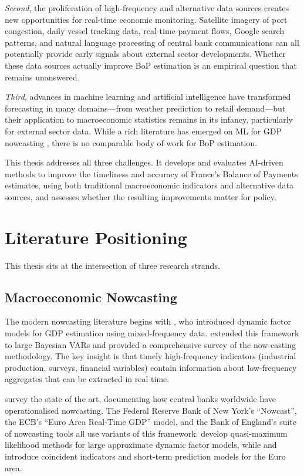 \emph{Second}, the proliferation of high-frequency and alternative data sources creates new opportunities for real-time economic monitoring.  Satellite imagery of port congestion, daily vessel tracking data, real-time payment flows, Google search patterns, and natural language processing of central bank communications can all potentially provide early signals about external sector developments.  Whether these data sources actually improve BoP estimation is an empirical question that remains unanswered.

\emph{Third}, advances in machine learning and artificial intelligence have transformed forecasting in many domains---from weather prediction to retail demand---but their application to macroeconomic statistics remains in its infancy, particularly for external sector data.  While a rich literature has emerged on ML for GDP nowcasting \citep{giannone2008nowcasting, banbura2013nowcasting, gouletcoulombe2022how}, there is no comparable body of work for BoP estimation.

This thesis addresses all three challenges.  It develops and evaluates AI-driven methods to improve the timeliness and accuracy of France's Balance of Payments estimates, using both traditional macroeconomic indicators and alternative data sources, and assesses whether the resulting improvements matter for policy.


\section*{Literature Positioning}

This thesis sits at the intersection of three research strands.

\subsection*{Macroeconomic Nowcasting}

The modern nowcasting literature begins with \citet{giannone2008nowcasting}, who introduced dynamic factor models for GDP estimation using mixed-frequency data.  \citet{banbura2010large, banbura2013nowcasting} extended this framework to large Bayesian VARs and provided a comprehensive survey of the now-casting methodology.  The key insight is that timely high-frequency indicators (industrial production, surveys, financial variables) contain information about low-frequency aggregates that can be extracted in real time.

\citet{bok2018macroeconomic} survey the state of the art, documenting how central banks worldwide have operationalised nowcasting.  The Federal Reserve Bank of New York's ``Nowcast'', the ECB's ``Euro Area Real-Time GDP'' model, and the Bank of England's suite of nowcasting tools all use variants of this framework.  \citet{doz2012quasi} develop quasi-maximum likelihood methods for large approximate dynamic factor models, while \citet{mariano2003new} and \citet{camacho2013introducing} introduce coincident indicators and short-term prediction models for the Euro area.

